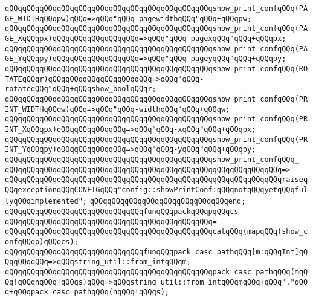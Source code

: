 \verb|qQQqqQQqqQQqqQQqqQQqqQQqqQQqqQQqqQQqqQQqqQQqqQQqshow_print_confqQQq(PAGE_WIDTHqQQqpw)qQQq=>qQQq"qQQq-pagewidthqQQq"qQQq+qQQqpw;|\newline
\verb|qQQqqQQqqQQqqQQqqQQqqQQqqQQqqQQqqQQqqQQqqQQqqQQqshow_print_confqQQq(PAGE_XqQQqpx)qQQqqQQqqQQqqQQqqQQq=>qQQq"qQQq-pagexqQQq"qQQq+qQQqpx;|\newline
\verb|qQQqqQQqqQQqqQQqqQQqqQQqqQQqqQQqqQQqqQQqqQQqqQQqshow_print_confqQQq(PAGE_YqQQqpy)qQQqqQQqqQQqqQQqqQQq=>qQQq"qQQq-pageyqQQq"qQQq+qQQqpy;|\newline
\verb|qQQqqQQqqQQqqQQqqQQqqQQqqQQqqQQqqQQqqQQqqQQqqQQqshow_print_confqQQq(ROTATEqQQqr)qQQqqQQqqQQqqQQqqQQqqQQq=>qQQq"qQQq-rotateqQQq"qQQq+qQQqshow_boolqQQqr;|\newline
\verb|qQQqqQQqqQQqqQQqqQQqqQQqqQQqqQQqqQQqqQQqqQQqqQQqshow_print_confqQQq(PRINT_WIDTHqQQqw)qQQq=>qQQq"qQQq-widthqQQq"qQQq+qQQqw;|\newline
\verb|qQQqqQQqqQQqqQQqqQQqqQQqqQQqqQQqqQQqqQQqqQQqqQQqshow_print_confqQQq(PRINT_XqQQqpx)qQQqqQQqqQQqqQQq=>qQQq"qQQq-xqQQq"qQQq+qQQqpx;|\newline
\verb|qQQqqQQqqQQqqQQqqQQqqQQqqQQqqQQqqQQqqQQqqQQqqQQqshow_print_confqQQq(PRINT_YqQQqpy)qQQqqQQqqQQqqQQq=>qQQq"qQQq-yqQQq"qQQq+qQQqpy;|\newline
\newline
\verb|qQQqqQQqqQQqqQQqqQQqqQQqqQQqqQQqqQQqqQQqqQQqqQQqshow_print_confqQQq_|\newline
\verb|qQQqqQQqqQQqqQQqqQQqqQQqqQQqqQQqqQQqqQQqqQQqqQQqqQQqqQQqqQQqqQQq=>|\newline
\verb|qQQqqQQqqQQqqQQqqQQqqQQqqQQqqQQqqQQqqQQqqQQqqQQqqQQqqQQqqQQqqQQqraiseqQQqexceptionqQQqCONFIGqQQq"config::showPrintConf:qQQqnotqQQqyetqQQqfullyqQQqimplemented";|\newline
\verb|qQQqqQQqqQQqqQQqqQQqqQQqqQQqqQQqend;|\newline
\newline
\verb|qQQqqQQqqQQqqQQqqQQqqQQqqQQqqQQqfunqQQqpackqQQqpqQQqcs|\newline
\verb|qQQqqQQqqQQqqQQqqQQqqQQqqQQqqQQqqQQqqQQqqQQqqQQq=|\newline
\verb|qQQqqQQqqQQqqQQqqQQqqQQqqQQqqQQqqQQqqQQqqQQqqQQqcatqQQq(mapqQQq(show_confqQQqp)qQQqcs);|\newline
\newline
\verb|qQQqqQQqqQQqqQQqqQQqqQQqqQQqqQQqfunqQQqpack_casc_pathqQQq[m:qQQqInt]qQQqqQQqqQQq=>qQQqstring_util::from_intqQQqm;|\newline
\verb|qQQqqQQqqQQqqQQqqQQqqQQqqQQqqQQqqQQqqQQqqQQqqQQqpack_casc_pathqQQq(mqQQq!qQQqnqQQq!qQQqs)qQQq=>qQQqstring_util::from_intqQQqmqQQq+qQQq"."qQQq+qQQqpack_casc_pathqQQq(nqQQq!qQQqs);|\newline

